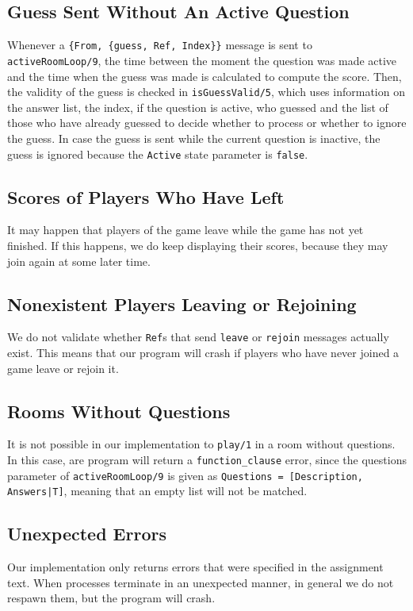 \documentclass{article}
\begin{document}
\subsection{Guess Sent Without An Active Question}
Whenever a \texttt{\{From, \{guess, Ref, Index\}\}} message is sent to \texttt{activeRoomLoop/9}, the time between the moment the question was made active and the time when the guess was made is calculated to compute the score. Then, the validity of the guess is checked in \texttt{isGuessValid/5}, which uses information on the answer list, the index, if the question is active, who guessed and the list of those who have already guessed to decide whether to process or whether to ignore the guess. In case the guess is sent while the current question is inactive, the guess is ignored because the \texttt{Active} state parameter is \texttt{false}.

\subsection{Scores of Players Who Have Left}
It may happen that players of the game leave while the game has not yet finished. If this happens, we do keep displaying their scores, because they may join again at some later time.

\subsection{Nonexistent Players Leaving or Rejoining}
We do not validate whether \texttt{Ref}s that send \texttt{leave} or \texttt{rejoin} messages actually exist. This means that our program will crash if players who have never joined a game leave or rejoin it.

\subsection{Rooms Without Questions}
It is not possible in our implementation to \texttt{play/1} in a room without questions. In this case, are program will return a  \texttt{function\_clause} error, since the questions parameter of \texttt{activeRoomLoop/9} is given as \texttt{Questions = [{Description, Answers}|T]}, meaning that an empty list will not be matched.

\subsection{Unexpected Errors}
Our implementation only returns errors that were specified in the assignment text. When processes terminate in an unexpected manner, in general we do not respawn them, but the program will crash.
\end{document}
